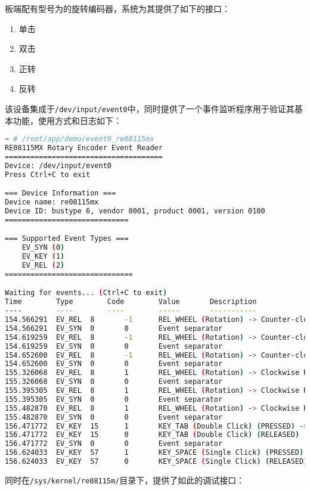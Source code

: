\documentclass[UTF8]{ctexart}
\newcommand{\code}[1]{\colorbox{gray!10}{\lstinline[style=inlinecode]|#1|}}
\begin{document}
板端配有型号为的旋转编码器，系统为其提供了如下的接口：

\begin{enumerate}
    \item 单击
    \item 双击
    \item 正转
    \item 反转
\end{enumerate}

\noindent 该设备集成于\code{/dev/input/event0}中，同时提供了一个事件监听程序用于验证其基本功能，使用方式和日志如下：

\begin{lstlisting}[language=sh]
~ # /root/app/demo/event0_re08115mx 
RE08115MX Rotary Encoder Event Reader
=====================================
Device: /dev/input/event0
Press Ctrl+C to exit

=== Device Information ===
Device name: re08115mx
Device ID: bustype 6, vendor 0001, product 0001, version 0100
=============================

=== Supported Event Types ===
    EV_SYN (0)
    EV_KEY (1)
    EV_REL (2)
==============================

Waiting for events... (Ctrl+C to exit)
Time		Type		Code		Value		Description
----		----		----		-----		-----------
154.566291	EV_REL	8		-1		REL_WHEEL (Rotation) -> Counter-clockwise Rotation (1 steps)
154.566291	EV_SYN	0		0		Event separator
154.619259	EV_REL	8		-1		REL_WHEEL (Rotation) -> Counter-clockwise Rotation (1 steps)
154.619259	EV_SYN	0		0		Event separator
154.652600	EV_REL	8		-1		REL_WHEEL (Rotation) -> Counter-clockwise Rotation (1 steps)
154.652600	EV_SYN	0		0		Event separator
155.326068	EV_REL	8		1		REL_WHEEL (Rotation) -> Clockwise Rotation (1 steps)
155.326068	EV_SYN	0		0		Event separator
155.395305	EV_REL	8		1		REL_WHEEL (Rotation) -> Clockwise Rotation (1 steps)
155.395305	EV_SYN	0		0		Event separator
155.482870	EV_REL	8		1		REL_WHEEL (Rotation) -> Clockwise Rotation (1 steps)
155.482870	EV_SYN	0		0		Event separator
156.471772	EV_KEY	15		1		KEY_TAB (Double Click) (PRESSED) -> Double Click Detected!
156.471772	EV_KEY	15		0		KEY_TAB (Double Click) (RELEASED)
156.471772	EV_SYN	0		0		Event separator
156.624033	EV_KEY	57		1		KEY_SPACE (Single Click) (PRESSED) -> Single Click Detected!
156.624033	EV_KEY	57		0		KEY_SPACE (Single Click) (RELEASED)    
\end{lstlisting}

同时在\code{/sys/kernel/re08115m/}目录下，提供了如此的调试接口：
\end{document}
